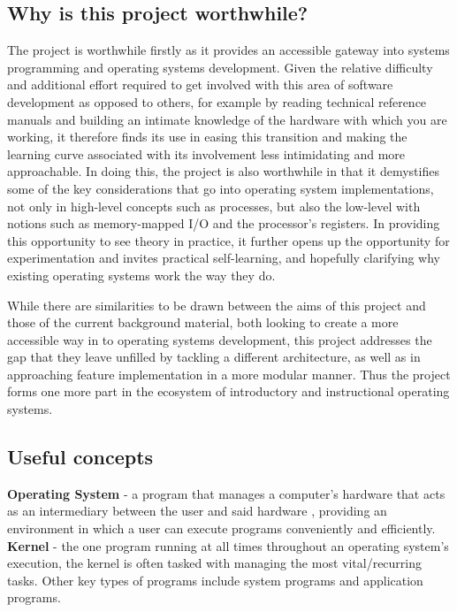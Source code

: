 \subsection{Why is this project worthwhile?}
    The project is worthwhile firstly as it provides an accessible gateway into
    systems programming and operating systems development. Given the relative
    difficulty and additional effort required to get involved with this area of
    software development as opposed to others, for example by reading technical
    reference manuals and building an intimate knowledge of the hardware with
    which you are working, it therefore finds its use in easing this transition
    and making the learning curve associated with its involvement less
    intimidating and more approachable. In doing this, the project is also
    worthwhile in that it demystifies some of the key considerations that go
    into operating system implementations, not only in high-level concepts such
    as processes, but also the low-level with notions such as memory-mapped I/O
    and the processor's registers. In providing this opportunity to see theory
    in practice, it further opens up the opportunity for experimentation and
    invites practical self-learning, and hopefully clarifying why existing
    operating systems work the way they do.

    While there are similarities to be drawn between the aims of this project
    and those of the current background material, both looking to create a more
    accessible way in to operating systems development, this project addresses
    the gap that they leave unfilled by tackling a different architecture, as
    well as in approaching feature implementation in a more modular manner. Thus
    the project forms one more part in the ecosystem of introductory and
    instructional operating systems.

\subsection{Useful concepts}
    \noindent \textbf{Operating System} - a program that manages a computer's hardware
    that acts as an intermediary between the user and said hardware
    \cite{DinosaurOS}, providing an environment in which a user can execute
    programs conveniently and efficiently. \\

    \noindent \textbf{Kernel} - the one program running at all times throughout
    an operating system's execution, the kernel is often tasked with managing
    the most vital/recurring tasks. Other key types of programs include system
    programs and application programs. \\

